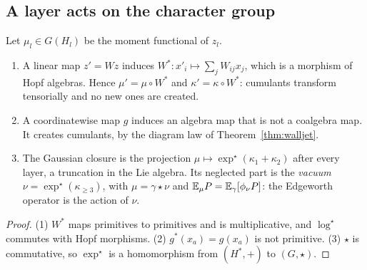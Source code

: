 \subsection{A layer acts on the character group}
\begin{proposition}[proved]\label{prop:layeraction}
Let $\mu_l\in G(H_l)$ be the moment functional of $z_l$.
\begin{enumerate}[leftmargin=*]
\item A linear map $z'=Wz$ induces $W^*:x'_i\mapsto\sum_jW_{ij}x_j$, which is a morphism of Hopf algebras. Hence $\mu'=\mu\circ W^*$ and
$\kappa'=\kappa\circ W^*$: cumulants transform tensorially and no new ones are created.
\item A coordinatewise map $g$ induces an algebra map that is not a coalgebra map. It creates cumulants, by the diagram law of
Theorem~\ref{thm:walljet}.
\item The Gaussian closure is the projection $\mu\mapsto\exp^\star(\kappa_1+\kappa_2)$ after every layer, a truncation in the Lie algebra. Its
neglected part is the \emph{vacuum} $\nu=\exp^\star(\kappa_{\ge3})$, with $\mu=\gamma\star\nu$ and $\mathbb E_\mu P=\mathbb E_\gamma[\phi_\nu P]$: the Edgeworth
operator is the action of $\nu$.
\end{enumerate}
\end{proposition}
\begin{proof}
(1) $W^*$ maps primitives to primitives and is multiplicative, and $\log^\star$ commutes with Hopf morphisms. (2) $g^*(x_a)=g(x_a)$ is not
primitive. (3) $\star$ is commutative, so $\exp^\star$ is a homomorphism from $(H^*,+)$ to $(G,\star)$.
\end{proof}

